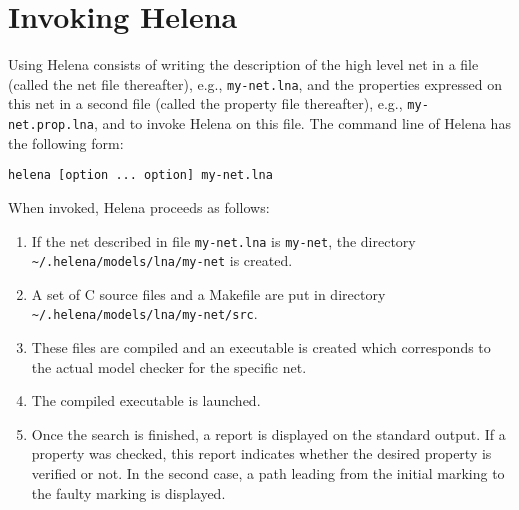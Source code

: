 \newcommand\optionDef[2]{\shortForm{#1}, \longForm{#2}}
\section{Invoking Helena}
\label{section_invoking_helena}
Using Helena consists of writing the description of the high level net
in a file (called the net file thereafter), e.g., \texttt{my-net.lna},
and the properties expressed on this net in a second file (called the
property file thereafter), e.g., \texttt{my-net.prop.lna}, and to
invoke Helena on this file.  The command line of Helena has the
following form:
\begin{center}
\begin{verbatim}
helena [option ... option] my-net.lna
\end{verbatim}
\end{center}

When invoked, Helena proceeds as follows:
\begin{enumerate}
\item If the net described in file \texttt{my-net.lna} is
  \texttt{my-net}, the directory \texttt{\~{}/.helena/models/lna/my-net}
  is created.
\item A set of C source files and a Makefile are put in directory
  \texttt{\~{}/.helena/models/lna/my-net/src}.
\item These files are compiled and an executable is created which
  corresponds to the actual model checker for the specific net.
\item The compiled executable is launched.
\item Once the search is finished, a report is displayed on the
  standard output.  If a property was checked, this report indicates
  whether the desired property is verified or not.  In the second
  case, a path leading from the initial marking to the faulty marking
  is displayed.
\end{enumerate}

